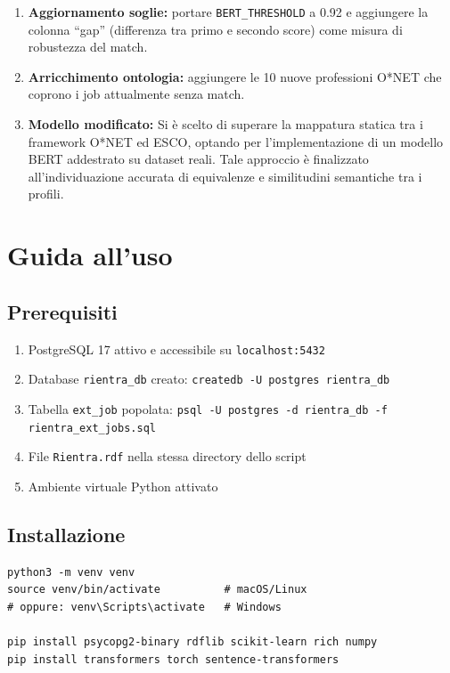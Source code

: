 \documentclass[12pt, a4paper]{report}
\begin{document}
\begin{enumerate}
  \item \textbf{Aggiornamento soglie:} portare
        \texttt{BERT\_THRESHOLD} a 0.92 e aggiungere la colonna
        ``gap'' (differenza tra primo e secondo score) come misura di
        robustezza del match.
  \item \textbf{Arricchimento ontologia:} aggiungere le 10 nuove
        professioni O*NET che coprono i job attualmente senza match.

  \item \textbf{Modello modificato:} Si è scelto di superare la mappatura statica tra i framework O*NET ed ESCO, optando per l'implementazione di un modello BERT addestrato su dataset reali. Tale approccio è finalizzato all'individuazione accurata di equivalenze e similitudini semantiche tra i profili.
\end{enumerate}

% 
\chapter{Guida all'uso}
% 

\section{Prerequisiti}

\begin{enumerate}
  \item PostgreSQL 17 attivo e accessibile su \texttt{localhost:5432}
  \item Database \texttt{rientra\_db} creato:
        \lstinline|createdb -U postgres rientra_db|
  \item Tabella \texttt{ext\_job} popolata:
        \lstinline|psql -U postgres -d rientra_db -f rientra_ext_jobs.sql|
  \item File \texttt{Rientra.rdf} nella stessa directory dello script
  \item Ambiente virtuale Python attivato
\end{enumerate}

\section{Installazione}

\begin{lstlisting}[caption={Setup ambiente}]
python3 -m venv venv
source venv/bin/activate          # macOS/Linux
# oppure: venv\Scripts\activate   # Windows

pip install psycopg2-binary rdflib scikit-learn rich numpy
pip install transformers torch sentence-transformers
\end{lstlisting}
\end{document}

